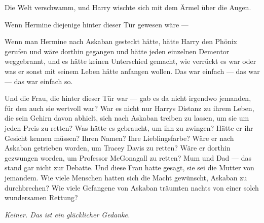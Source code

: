 Die Welt verschwamm, und Harry wischte sich mit dem Ärmel über die Augen.

Wenn Hermine diejenige hinter dieser Tür gewesen wäre —

Wenn man Hermine nach Askaban gesteckt hätte, hätte Harry den Phönix gerufen und wäre dorthin gegangen und hätte jeden einzelnen Dementor weggebrannt, und es hätte keinen Unterschied gemacht, wie verrückt es war oder was er sonst mit seinem Leben hätte anfangen wollen. Das war einfach — das war — das war einfach so.

Und die Frau, die hinter dieser Tür war — gab es da nicht irgendwo jemanden, für den auch sie wertvoll war? War es nicht nur Harrys Distanz zu ihrem Leben, die sein Gehirn davon abhielt, sich nach Askaban treiben zu lassen, um sie um jeden Preis zu retten? Was hätte es gebraucht, um ihn zu zwingen? Hätte er ihr Gesicht kennen müssen? Ihren Namen? Ihre Lieblingsfarbe? Wäre er nach Askaban getrieben worden, um Tracey Davis zu retten? Wäre er dorthin gezwungen worden, um Professor McGonagall zu retten? Mum und Dad — das stand gar nicht zur Debatte. Und diese Frau hatte gesagt, sie sei die Mutter von jemandem. Wie viele Menschen hatten sich die Macht gewünscht, Askaban zu durchbrechen? Wie viele Gefangene von Askaban träumten nachts von einer solch wundersamen Rettung?

\emph{Keiner. Das ist ein glücklicher Gedanke.}

